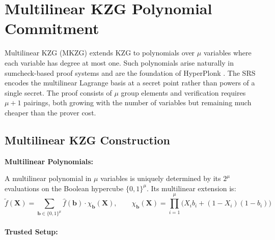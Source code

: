 
\chapter{Multilinear KZG Polynomial Commitment}
\label{chap:mkzg}

Multilinear KZG (MKZG) extends KZG to polynomials over $\mu$
variables where each variable has degree at most one. Such
polynomials arise naturally in sumcheck-based proof systems and are
the foundation of HyperPlonk \cite{hyperplonk2022}. The SRS encodes
the multilinear Lagrange basis at a secret point rather than powers
of a single secret. The proof consists of $\mu$ group elements and
verification requires $\mu + 1$ pairings, both growing with the
number of variables but remaining much cheaper than the prover cost.

\section{Multilinear KZG Construction}

\textbf{Multilinear Polynomials:}

A multilinear polynomial in $\mu$ variables is uniquely determined
by its $2^\mu$ evaluations on the Boolean hypercube $\{0,1\}^\mu$.
Its multilinear extension is:
\begin{equation}
    \tilde{f}(\mathbf{X})
    = \sum_{\mathbf{b} \in \{0,1\}^\mu}
      \hat{f}(\mathbf{b}) \cdot \chi_{\mathbf{b}}(\mathbf{X}),
    \qquad
    \chi_{\mathbf{b}}(\mathbf{X})
    = \prod_{i=1}^{\mu}
      \bigl( X_i b_i + (1 - X_i)(1 - b_i) \bigr)
\end{equation}
\\
\textbf{Trusted Setup:}

